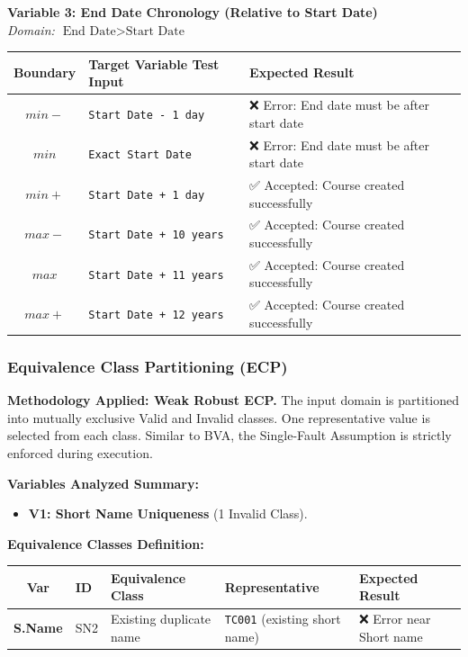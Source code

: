 \documentclass[twoside,final]{hcmut-report}
\begin{document}
\vspace{0.3cm}
\noindent\textbf{Variable 3: End Date Chronology (Relative to Start Date)} \\
\textit{Domain: $\text{End Date} > \text{Start Date}$}
\begin{table}[H]
\centering
\renewcommand{\arraystretch}{1.2}
\begin{tabularx}{\textwidth}{|c|l|X|}
\hline
\textbf{Boundary} & \textbf{Target Variable Test Input} & \textbf{Expected Result} \\ \hline
$min-$ & \texttt{Start Date - 1 day} & ❌ Error: End date must be after start date \\ \hline
$min$ & \texttt{Exact Start Date} & ❌ Error: End date must be after start date \\ \hline
$min+$ & \texttt{Start Date + 1 day} & ✅ Accepted: Course created successfully \\ \hline
$max-$ & \texttt{Start Date + 10 years} & ✅ Accepted: Course created successfully \\ \hline
$max$ & \texttt{Start Date + 11 years} & ✅ Accepted: Course created successfully \\ \hline
$max+$ & \texttt{Start Date + 12 years} & ✅ Accepted: Course created successfully \\ \hline
\end{tabularx}
\end{table}

\subsubsection{Equivalence Class Partitioning (ECP)}
\textbf{Methodology Applied: Weak Robust ECP.}
The input domain is partitioned into mutually exclusive Valid and Invalid classes. One representative value is selected from each class. Similar to BVA, the Single-Fault Assumption is strictly enforced during execution.

\textbf{Variables Analyzed Summary:}
\begin{itemize}
    \item \textbf{V1: Short Name Uniqueness} (1 Invalid Class).
\end{itemize}

\vspace{0.3cm}
\noindent\textbf{Equivalence Classes Definition:}
\begin{table}[H]
\centering
\renewcommand{\arraystretch}{1.2}
\begin{tabularx}{\textwidth}{|c|l|X|l|X|}
\hline
\textbf{Var} & \textbf{ID} & \textbf{Equivalence Class} & \textbf{Representative} & \textbf{Expected Result} \\ \hline
\multirow{1}{*}{\textbf{S.Name}} 
& SN2 & Existing duplicate name & \texttt{TC001} (existing short name) & ❌ Error near Short name \\ \hline
\end{tabularx}
\end{table}
\end{document}
